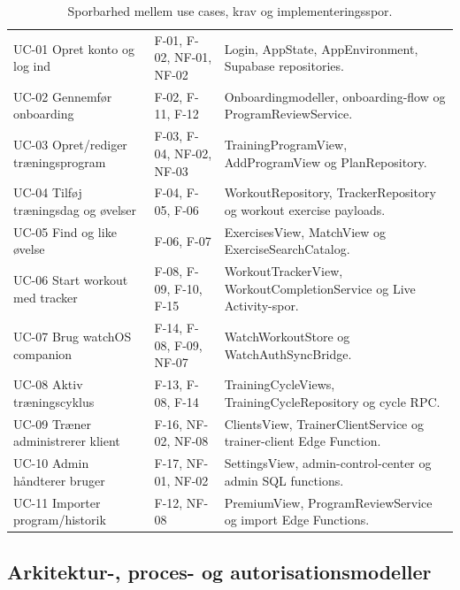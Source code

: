 \begin{table}[htbp]
\footnotesize
\renewcommand{\arraystretch}{1.12}
\begin{tabularx}{\textwidth}{>{\RaggedRight\arraybackslash}p{} >{\RaggedRight\arraybackslash}p{} Y}
\toprule
{} &  &  \\
\midrule
UC-01 Opret konto og log ind & F-01, F-02, NF-01, NF-02 & Login, AppState, AppEnvironment, Supabase repositories. \\
UC-02 Gennemfør onboarding & F-02, F-11, F-12 & Onboardingmodeller, onboarding-flow og ProgramReviewService. \\
UC-03 Opret/rediger træningsprogram & F-03, F-04, NF-02, NF-03 & TrainingProgramView, AddProgramView og PlanRepository. \\
UC-04 Tilføj træningsdag og øvelser & F-04, F-05, F-06 & WorkoutRepository, TrackerRepository og workout exercise payloads. \\
UC-05 Find og like øvelse & F-06, F-07 & ExercisesView, MatchView og ExerciseSearchCatalog. \\
UC-06 Start workout med tracker & F-08, F-09, F-10, F-15 & WorkoutTrackerView, WorkoutCompletionService og Live Activity-spor. \\
UC-07 Brug watchOS companion & F-14, F-08, F-09, NF-07 & WatchWorkoutStore og WatchAuthSyncBridge. \\
UC-08 Aktiv træningscyklus & F-13, F-08, F-14 & TrainingCycleViews, TrainingCycleRepository og cycle RPC. \\
UC-09 Træner administrerer klient & F-16, NF-02, NF-08 & ClientsView, TrainerClientService og trainer-client Edge Function. \\
UC-10 Admin håndterer bruger & F-17, NF-01, NF-02 & SettingsView, admin-control-center og admin SQL functions. \\
UC-11 Importer program/historik & F-12, NF-08 & PremiumView, ProgramReviewService og import Edge Functions. \\
\bottomrule
\end{tabularx}
\caption{Sporbarhed mellem use cases, krav og implementeringsspor.}
\label{tab:tm-krav-traceability}
\end{table}

\clearpage

\subsection{Arkitektur-, proces- og autorisationsmodeller}

